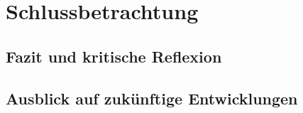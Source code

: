 \section{Schlussbetrachtung}

\subsection{Fazit und kritische Reflexion}

\subsection{Ausblick auf zukünftige Entwicklungen}